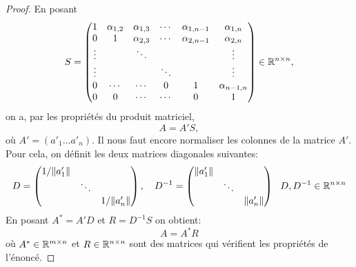 \begin{proof}
En posant 
\begin{displaymath}
S = %
\begin{pmatrix}
1 & \alpha_{1,2} & \alpha_{1,3} & \cdots & \alpha_{1,n-1} & \alpha_{1,n}\\
0 & 1 & \alpha_{2,3} & \cdots & \alpha_{2,n-1} & \alpha_{2,n} \\
\vdots && \ddots &&& \vdots \\
\vdots &&& \ddots &&\vdots\\
0 & \cdots & \cdots&0& 1 & \alpha_{n-1,n}\\
0 & 0 & \cdots &\cdots & 0 & 1
\end{pmatrix} \in \R^{n \times n}, 
\end{displaymath}
on a, par les propriétés du produit matriciel,
\begin{displaymath}
A = A'S,  %
\end{displaymath}
où $A' = (a'_1 \dots a'_n)$. Il nous faut encore normaliser les colonnes de la matrice $A'$. Pour cela, on définit les deux matrices diagonales suivantes:
\begin{displaymath}
D=\begin{pmatrix}
1/\|a'_1\| & & \\
& \ddots & \\
& & 1/\|a'_n\|
\end{pmatrix} , \quad 
D^{-1}=\begin{pmatrix}
\|a'_1\| & & \\
& \ddots & \\
& & \|a'_n\|
\end{pmatrix} 
~~ D,D^{-1} \in \mathbb{R}^{n \times n}
\end{displaymath}
En posant $A^*=A'D$ et $R=D^{-1}S$ on obtient:
\begin{displaymath}
A=A^* R
\end{displaymath}
où $A^* \in \mathbb{R}^{m\times n}$ et $R \in \mathbb{R}^{n \times n}$ sont des matrices qui vérifient les propriétés de l'énoncé. 
\end{proof}


